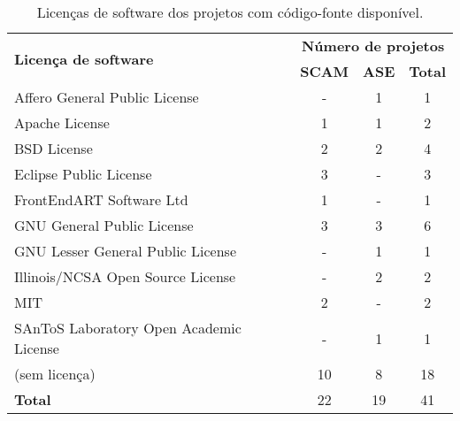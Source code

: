 \begin{table}[h]
\caption{Licenças de software dos projetos com código-fonte disponível.}
\centering
\begin{tabular}{l c c c}
  \hline
  \multirow{2}{*}{{\bf Licença de software}} & \multicolumn{3}{c}{{\bf Número de projetos}} \\
                                             & {\bf SCAM} & {\bf ASE} & {\bf Total} \\
  \hline
  Affero General Public License &
    - &
    1 &
    1 \\
  Apache License &
    1 &
    1 &
    2 \\
  BSD License &
    2 &
    2 &
    4 \\
  Eclipse Public License &
    3 &
    - &
    3 \\
  FrontEndART Software Ltd &
    1 &
    - &
    1 \\
  GNU General Public License &
    3 &
    3 &
    6 \\
  GNU Lesser General Public License &
    - &
    1 &
    1 \\
  Illinois/NCSA Open Source License &
    - &
    2 &
    2 \\
  MIT &
    2 &
    - &
    2 \\
  SAnToS Laboratory Open Academic License &
    - &
    1 &
    1 \\
  (sem licença) &
    10 &
    8 &
    18 \\
  \hline
  {\bf Total} & 22 & 19 & 41 \\
  \hline
\end{tabular}
\label{license-table}
\end{table}
